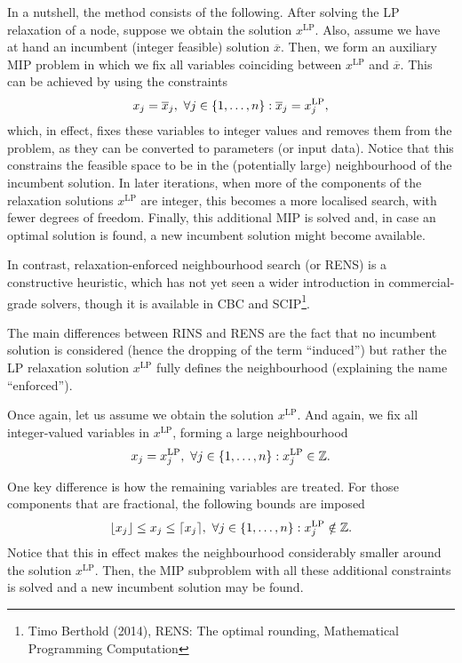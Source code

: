 In a nutshell, the method consists of the following. After solving the LP relaxation of a node, suppose we obtain the solution $x^{\text{LP}}$. Also, assume we have at hand an incumbent (integer feasible) solution $\overline{x}$. Then, we form an auxiliary MIP problem in which we fix all variables coinciding between $x^{\text{LP}}$ and $\overline{x}$. This can be achieved by using the constraints
	\begin{equation*}
		x_j = \overline{x}_j, \ \forall j \in \left\{ 1,\dots,n \right \} : \overline{x}_j = x^\text{LP}_j,	
	\end{equation*}
	which, in effect, fixes these variables to integer values and removes them from the problem, as they can be converted to parameters (or input data). Notice that this constrains the feasible space to be in the (potentially large) neighbourhood of the incumbent solution. In later iterations, when more of the components of the relaxation solutions $x^{\text{LP}}$ are integer, this becomes a more localised search, with fewer degrees of freedom. Finally, this additional MIP is solved and, in case an optimal solution is found, a new incumbent solution might become available.

In contrast, relaxation-enforced neighbourhood search (or RENS) is a constructive heuristic, which has not yet seen a wider introduction in commercial-grade solvers, though it is available in   CBC and SCIP\footnote{Timo Berthold (2014), RENS: The optimal rounding, Mathematical Programming Computation}.
 
The main differences between RINS and RENS are the fact that no incumbent solution is considered (hence the dropping of the term ``induced'') but rather the LP relaxation solution $x^{\text{LP}}$ fully defines the neighbourhood (explaining the name ``enforced'').
 
Once again, let us assume we obtain the solution $x^{\text{LP}}$. And again, we fix all integer-valued variables in $x^{\text{LP}}$, forming a large neighbourhood
%
\begin{equation*}
	x_j = x_j^{\text{LP}}, \ \forall j \in \left\{ 1,\dots,n \right \} : x_j^{\text{LP}} \in \mathbb{Z}.
\end{equation*}
%

One key difference is how the remaining variables are treated. For those components that are fractional, the following bounds are imposed
%
\begin{equation*}
	\lfloor x_j \rfloor \leq x_j \leq \lceil x_j \rceil, \ \forall j \in \left\{ 1,\dots,n \right \} : x_j^{\text{LP}} \notin \mathbb{Z}.
\end{equation*}
%
Notice that this in effect makes the neighbourhood considerably smaller around the solution $x^{\text{LP}}$. Then, the MIP subproblem with all these additional constraints is solved and a new incumbent solution may be found. 

